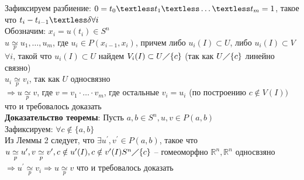 	Зафиксируем разбиение: $0 = t_0 \textless t_1 \textless  \ldots  \textless t_m = 1$, такое что $t_i - t_{i-1} \textless \delta \forall i$\\
	Обозначим: $x_i = u(t_i) \in S^n$\\
	$u \underset{p}{\simeq} u_1, \ldots ,u_m$, где $u_i \in P(x_{i-1}, x_i)$, причем либо $u_i (I) \subset U$, либо $u_i (I) \subset V$\\
	$\forall i$, такой что $u_i (I) \subset U$ найдем $V_i (I) \subset U \diagup \{ c\}$ (так как $U\diagup \{c\}$ линейно связно)\\
	$u_i \underset{p}{\simeq} v_i$, так как $U$ односвязно\\
	$\Rightarrow u \underset{p}{\simeq} v$, где $v = v_1 \cdot  \ldots  \cdot v_m$, где остальные $v_i = u_i$ (по построению $c\notin V(I))$ что и требовалось доказать\\
	\textbf{Доказательство теоремы}: Пусть $a, b \in S^n, u,v \in P(a,b)$\\
	Зафиксируем: $\forall c\notin \{a,b\}$\\
	Из Леммы 2 следует, что $\exists u^{\prime},v^{\prime} \in P(a,b)$, такое что $u \underset{p}{\simeq} u^{\prime}, v \underset{p}{\simeq} v^{\prime}, c\notin u^{\prime} (I), c\notin v^{\prime} (I)\\
	S^n \diagup \{c\}$ -- гомеоморфно $\mathbb{R}^n, \mathbb{R}^n$ односвзяно $\Rightarrow u^{\prime} \underset{p}{\simeq} v_i \Rightarrow u \underset{p}{\simeq} v$ что и требовалось доказать
	


\newpage
